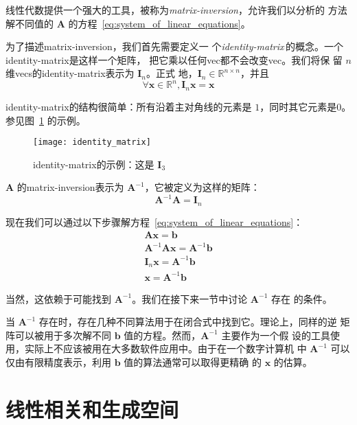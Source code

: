 线性代数提供一个强大的工具，被称为\emph{\gls{matrix-inversion}}，允许我们以分析的
方法解不同值的 $\pmb{A}$ 的方程~\ref{eq:system_of_linear_equations}。

为了描述\gls*{matrix-inversion}，我们首先需要定义一
个\emph{\gls{identity-matrix}}\,的概念。一个\gls*{identity-matrix}是这样一个矩阵，
把它乘以任何\gls*{vec}都不会改变\gls*{vec}。我们将保
留 $n$ 维\gls*{vecs}的\gls*{identity-matrix}表示为 $\pmb{I}_n$。正式
地，$\pmb{I}_n \in \mathbb{R}^{n \times n}$，并且
\begin{equation}
  \forall \pmb{x} \in \mathbb{R}^n, \pmb{I}_n\pmb{x} = \pmb{x}
  \label{eq:definition_of_identity_matrix}
\end{equation}

\gls*{identity-matrix}的结构很简单：所有沿着主对角线的元素是
$1$，同时其它元素是$0$。参见图~\ref{fig:identity_matrix} 的示例。

\begin{figure}[h]
  \centering
  \texttt{[image: identity\_matrix]}
  \caption{\gls*{identity-matrix}的示例：这是
    $\pmb{I}_3$\label{fig:identity_matrix}}
\end{figure}

$\pmb{A}$ 的\gls*{matrix-inversion}表示为 $\pmb{A}^{-1}$，它被定义为这样的矩阵：
\begin{equation}
  \pmb{A}^{-1}\pmb{A} = \pmb{I}_n
  \label{eq:matrix-inverse}
\end{equation}

现在我们可以通过以下步骤解方程~\ref{eq:system_of_linear_equations}：
\begin{gather}
  \pmb{A}\pmb{x} = \pmb{b}\\
  \pmb{A}^{-1}\pmb{A}\pmb{x} = \pmb{A}^{-1}\pmb{b}\\
  \pmb{I}_n\pmb{x} = \pmb{A}^{-1}\pmb{b}\\
  \pmb{x} = \pmb{A}^{-1}\pmb{b}
\end{gather}

当然，这依赖于可能找到 $\pmb{A}^{-1}$。我们在接下来一节中讨论 $\pmb{A}^{-1}$ 存在
的条件。

当 $\pmb{A}^{-1}$ 存在时，存在几种不同算法用于在闭合式中找到它。理论上，同样的逆
矩阵可以被用于多次解不同 $\pmb{b}$ 值的方程。然而，$\pmb{A}^{-1}$ 主要作为一个假
设的工具使用，实际上不应该被用在大多数软件应用中。由于在一个数字计算机
中 $\pmb{A}^{-1}$ 可以仅由有限精度表示，利用 $\pmb{b}$ 值的算法通常可以取得更精确
的 $\pmb{x}$ 的估算。

\section{线性相关和生成空间}
\label{sec:linear_dependence_and_span}

